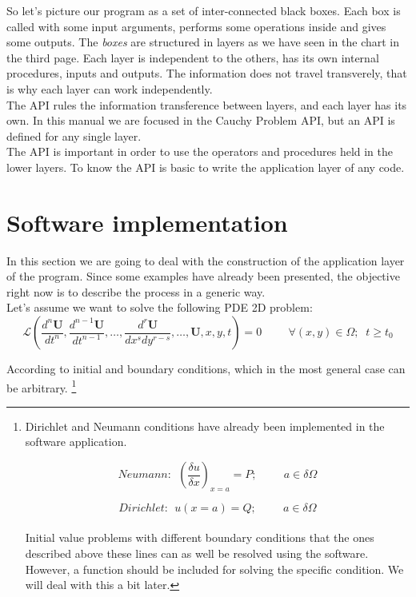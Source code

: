 \vspace{1cm}

So let's picture our program as a set of  inter-connected black boxes. Each box
is called with some input arguments, performs some operations inside and gives
some outputs. The \textit{boxes} are structured in layers as we have seen in the
chart in the third page. Each layer is independent to the others, has its own
internal procedures, inputs and outputs. The information does not travel
transverely, that is why each layer can work independently. \\

The API rules the information transference between layers, and each layer has
its own. In this manual we are focused in the Cauchy Problem API, but an API is
defined for any single layer.\\

The API is important in order to use the operators and procedures held
in the lower layers. To know the API is basic to write the application layer of
any code. 
\\

\newpage
\section{Software implementation}

In this section we are going to deal with the construction of the application
layer of the program.
Since some examples have already been presented, the objective right now is to describe the process in a generic
way.\\

Let's assume we want to solve the following PDE 2D problem: 
$$
\mathscr{L}\left(\frac{d^n \mathbf U}{dt^n}, \frac{d^{n-1} \mathbf
U}{dt^{n-1}}, \ldots, \frac{d^r \mathbf U}{dx^s dy^{r-s}}, \ldots,
\mathbf U, x, y, t\right)=0 \hspace{1cm} \forall(x,y)\in\Omega; \;\; t\geq t_0
$$

According to initial and boundary conditions, which in the most general case
can be arbitrary. \footnote{Dirichlet and Neumann conditions have already been 
implemented in the software application.

$$
Neumann: \:\: \left(\frac{\delta u}{\delta
x}\right)_{x=a} = P; \hspace{1cm} a\in \delta \Omega$$


$$
Dirichlet: \:\: u(x=a)=Q; \hspace{1cm}  a\in \delta \Omega
$$\\

Initial value problems with different boundary conditions that the ones described above 
these lines can as well be resolved using the software. However, a function should be included 
for solving the specific condition. 
We will deal with this a bit later. 
}\\

